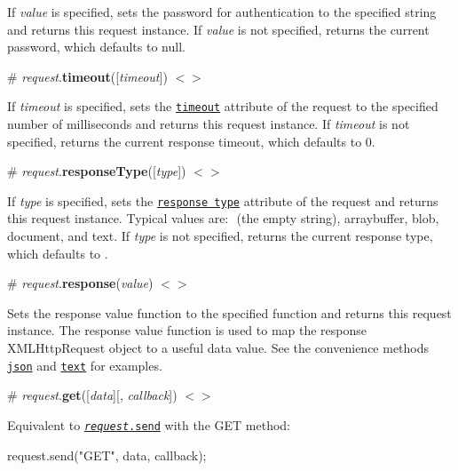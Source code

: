 If {\itshape value} is specified, sets the password for authentication to the specified string and returns this request instance. If {\itshape value} is not specified, returns the current password, which defaults to null.

\label{_request_timeout}%
\# {\itshape request}.{\bfseries timeout}(\mbox{[}{\itshape timeout}\mbox{]}) \href{https://github.com/d3/d3-request/blob/master/src/request.js#L74}{\tt $<$$>$}

If {\itshape timeout} is specified, sets the \href{http://www.w3.org/TR/XMLHttpRequest/#the-timeout-attribute}{\tt timeout} attribute of the request to the specified number of milliseconds and returns this request instance. If {\itshape timeout} is not specified, returns the current response timeout, which defaults to 0.

\label{_request_responseType}%
\# {\itshape request}.{\bfseries response\+Type}(\mbox{[}{\itshape type}\mbox{]}) \href{https://github.com/d3/d3-request/blob/master/src/request.js#L68}{\tt $<$$>$}

If {\itshape type} is specified, sets the \href{http://www.w3.org/TR/XMLHttpRequest/#the-responsetype-attribute}{\tt response type} attribute of the request and returns this request instance. Typical values are\+: {\ttfamily ​} (the empty string), {\ttfamily arraybuffer}, {\ttfamily blob}, {\ttfamily document}, and {\ttfamily text}. If {\itshape type} is not specified, returns the current response type, which defaults to {\ttfamily ​}.

\label{_request_response}%
\# {\itshape request}.{\bfseries response}({\itshape value}) \href{https://github.com/d3/d3-request/blob/master/src/request.js#L90}{\tt $<$$>$}

Sets the response value function to the specified function and returns this request instance. The response value function is used to map the response X\+M\+L\+Http\+Request object to a useful data value. See the convenience methods \href{#json}{\tt json} and \href{#text}{\tt text} for examples.

\label{_request_get}%
\# {\itshape request}.{\bfseries get}(\mbox{[}{\itshape data}\mbox{]}\mbox{[}, {\itshape callback}\mbox{]}) \href{https://github.com/d3/d3-request/blob/master/src/request.js#L96}{\tt $<$$>$}

Equivalent to \href{#request_send}{\tt {\itshape request}.send} with the G\+ET method\+:


\begin{DoxyCode}
request.send("GET", data, callback);
\end{DoxyCode}


